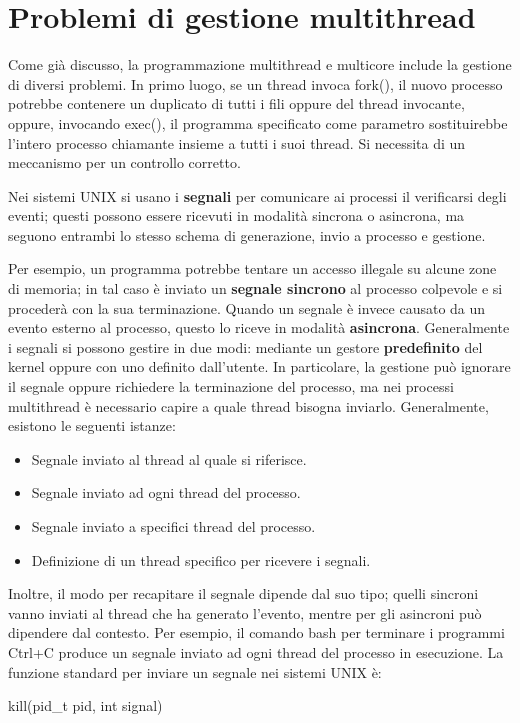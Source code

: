 \section{Problemi di gestione multithread}
Come già discusso, la programmazione multithread e multicore include la gestione di diversi problemi. In primo luogo, se un thread invoca fork(), il
nuovo processo potrebbe contenere un duplicato di tutti i fili oppure del thread invocante, oppure, invocando exec(), il programma specificato come
parametro sostituirebbe l'intero processo chiamante insieme a tutti i suoi thread. Si necessita di un meccanismo per un controllo corretto.\par
Nei sistemi UNIX si usano i \textbf{segnali} per comunicare ai processi il verificarsi degli eventi; questi possono essere ricevuti in modalità
sincrona o asincrona, ma seguono entrambi lo stesso schema di generazione, invio a processo e gestione.\par
Per esempio, un programma potrebbe tentare un accesso illegale su alcune zone di memoria; in tal caso è inviato un \textbf{segnale sincrono} al processo
colpevole e si procederà con la sua terminazione. Quando un segnale è invece causato da un evento esterno al processo, questo lo riceve in modalità
\textbf{asincrona}. Generalmente i segnali si possono gestire in due modi: mediante un gestore \textbf{predefinito} del kernel oppure con uno definito
dall'utente. In particolare, la gestione può ignorare il segnale oppure richiedere la terminazione del processo, ma nei processi multithread è
necessario capire a quale thread bisogna inviarlo. Generalmente, esistono le seguenti istanze: \begin{itemize}
	\item Segnale inviato al thread al quale si riferisce.
	\item Segnale inviato ad ogni thread del processo.
	\item Segnale inviato a specifici thread del processo.
	\item Definizione di un thread specifico per ricevere i segnali.
\end{itemize}
\noindent Inoltre, il modo per recapitare il segnale dipende dal suo tipo; quelli sincroni vanno inviati al thread che ha generato l'evento, mentre per
gli asincroni può dipendere dal contesto. Per esempio, il comando bash per terminare i programmi Ctrl+C produce un segnale inviato ad ogni thread del
processo in esecuzione. La funzione standard per inviare un segnale nei sistemi UNIX è: \begin{center}
	kill(pid\_t pid, int signal)
\end{center}

